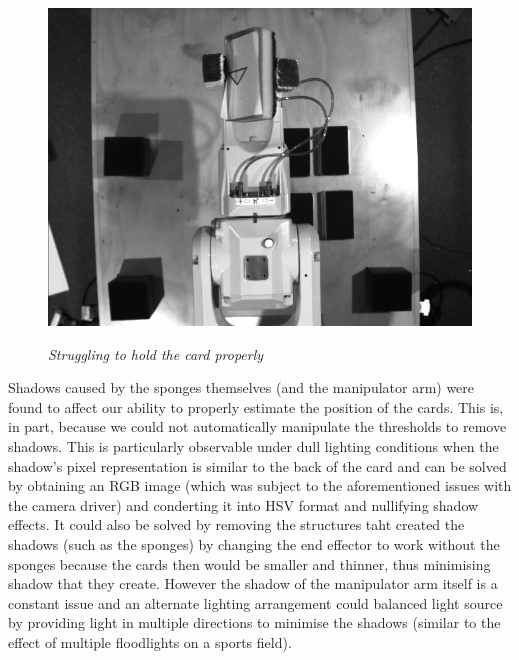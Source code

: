 \begin{figure}[position = here]
	\begin{centering}
		\includegraphics[scale=0.3]{./test_images_gray/test_image54.png}\\
		\caption[]{\textit{Struggling to hold the card properly\label{cardStrug}}}
	\end{centering}
\end{figure}

Shadows caused by the sponges themselves (and the manipulator arm) were found to affect our ability to properly estimate the position of the cards. This is, in part, because we could not automatically manipulate the thresholds to remove shadows. This is particularly observable under dull lighting conditions when the shadow's pixel representation is similar to the back of the card and can be solved by obtaining an RGB image (which was subject to the aforementioned issues with the camera driver) and conderting it into HSV format and nullifying shadow effects. It could also be solved by removing the structures taht created the shadows (such as the sponges) by changing the end effector to work without the sponges because the cards then would be smaller and thinner, thus minimising shadow that they create. However the shadow of the manipulator arm itself is a constant issue and an alternate lighting arrangement could balanced light source by providing light in multiple directions to minimise the shadows (similar to the effect of multiple floodlights on a sports field).